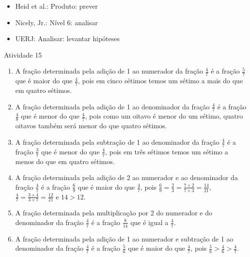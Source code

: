 \begin{itemize} %
    \item       Heid et al.: Produto: prever
    \item       Nicely, Jr.: Nível 6: analisar
    \item       UERJ: Analisar: levantar hipóteses
\end{itemize} %

\begin{resposta*}{Atividade 15}
\begin{enumerate} [\quad a)] %
    \item       A fração determinada pela adição de 1 ao numerador da fração
  $\frac{4}{7}$       é a fração       $\frac{5}{7}$       que é maior do que
   $\frac{4}{7}$, pois em cinco sétimos temos um sétimo a mais do que em quatro
sétimos.
\newpage
    \item       A fração determinada pela adição de 1 ao denominador da fração
    $\frac{4}{7}$       é a fração       $\frac{4}{8}$       que é menor do que
     $\frac{4}{7}$, pois como um oitavo é menor do um sétimo, quatro oitavos
também será menor do que quatro sétimos.
    \item       A fração determinada pela subtração de 1 ao denominador da
fração       $\frac{4}{7}$       é a fração       $\frac{3}{7}$       que é
menor do que       $\frac{4}{7}$, pois em três sétimos temos um sétimo a menos
do que em quatro sétimos.
    \item       A fração determinada pela adição de 2 ao numerador e ao
denominador da fração       $\frac{4}{7}$       é a fração       $\frac{6}{9}$
    que é maior do que       $\frac{4}{7}$, pois       $\frac{6}{9} =
\frac{2}{3} = \frac{7 \times 2}{7 \times 3} = \frac{14}{21}$,       $\frac{4}{7}
= \frac{3 \times 4}{3 \times 7} = \frac{12}{21}$       e       $14 > 12$.
    \item       A fração determinada pela multiplicação por 2 do numerador e do
denominador da fração       $\frac{4}{7}$       é a fração       $\frac{8}{14}$
     que é igual a       $\frac{4}{7}$.
    \item       A fração determinada pela adição de 1 ao numerador e subtração
de 1 ao denominador da fração       $\frac{4}{7}$       é a fração
$\frac{5}{6}$       que é maior do que       $\frac{4}{7}$, pois
$\frac{5}{6} > \frac{4}{6} > \frac{4}{7}$.
\end{enumerate} %


\end{resposta*}



